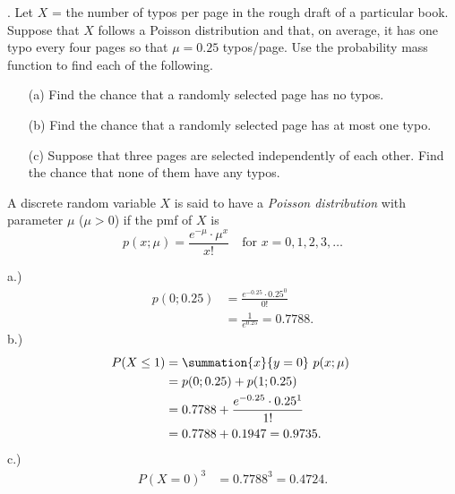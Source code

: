 \documentclass{report}
\begin{document}
 \begin{mdframed}
     . Let \( X \) = the number of typos per page in the rough draft of a particular book. Suppose that \( X \) follows a Poisson distribution and that, on average, it has one typo every four pages so that \( \mu = 0.25 \) typos/page. Use the probability mass function to find each of the following.
     \begin{itemize}
         \item[(a)] Find the chance that a randomly selected page has no typos.
         \item[(b)] Find the chance that a randomly selected page has at most one typo.
         \item[(c)] Suppose that three pages are selected independently of each other. Find the chance that none of them have any typos.
     \end{itemize}
 \end{mdframed}
 \bigbreak \noindent 
 \begin{remark}
     A discrete random variable \( X \) is said to have a \textit{Poisson distribution} with parameter \( \mu \) (\( \mu > 0 \)) if the pmf of \( X \) is
     \[
         p(x; \mu) = \frac{e^{-\mu} \cdot \mu^x}{x!} \quad \text{for } x = 0, 1, 2, 3, \ldots
     \]
 \end{remark}
 \bigbreak \noindent 
 a.)
 \begin{align*}
     p(0;0.25) &= \frac{e^{-0.25} \cdot 0.25^{0}}{0!} \\
     &=\frac{1}{e^{0.25}} = 0.7788
 .\end{align*}
 \bigbreak \noindent 
 b.) 
 \begin{align*}
     P(X \leq 1) &= \summation{x}{y=0}\ p(x; \mu)\ \\
     &=p(0;0.25) + p(1;0.25) \\
     &= 0.7788 + \frac{e^{-0.25}\cdot 0.25^{1}}{1!} \\
     &=0.7788 + 0.1947 = 0.9735
 .\end{align*}
 \bigbreak \noindent 
 c.) 
 \begin{align*}
     P(X = 0)^{3} &= 0.7788^{3} = 0.4724
 .\end{align*}
 
\end{document}
